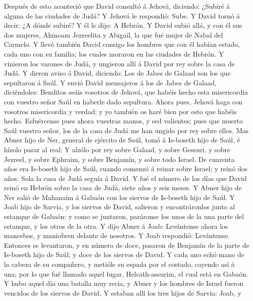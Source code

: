  Después de esto aconteció que David consultó á Jehová,
diciendo: ¿Subiré á alguna de las ciudades de Judá? Y Jehová le
respondió: Sube. Y David tornó á decir: ¿A dónde subiré? Y él le dijo: A
Hebrón.  Y David subió allá, y con él sus dos mujeres,
Ahinoam Jezreelita y Abigail, la que fué mujer de Nabal del Carmelo.
 Y llevó también David consigo los hombres que con él habían
estado, cada uno con su familia; los cuales moraron en las ciudades de
Hebrón.  Y vinieron los varones de Judá, y ungieron allí á
David por rey sobre la casa de Judá. Y dieron aviso á David, diciendo:
Los de Jabes de Galaad son los que sepultaron á Saúl.  Y
envió David mensajeros á los de Jabes de Galaad, diciéndoles: Benditos
seáis vosotros de Jehová, que habéis hecho esta misericordia con vuestro
señor Saúl en haberle dado sepultura.  Ahora pues, Jehová
haga con vosotros misericordia y verdad; y yo también os haré bien por
esto que habéis hecho.  Esfuércense pues ahora vuestras
manos, y sed valientes; pues que muerto Saúl vuestro señor, los de la
casa de Judá me han ungido por rey sobre ellos.  Mas Abner
hijo de Ner, general de ejército de Saúl, tomó á Is-boseth hijo de Saúl,
é hízolo pasar al real:  Y alzólo por rey sobre Galaad, y
sobre Gessuri, y sobre Jezreel, y sobre Ephraim, y sobre Benjamín, y
sobre todo Israel.  De cuarenta años era Is-boseth hijo de
Saúl, cuando comenzó á reinar sobre Israel; y reinó dos años. Sola la
casa de Judá seguía á David.  Y fué el número de los días
que David reinó en Hebrón sobre la casa de Judá, siete años y seis
meses.  Y Abner hijo de Ner salió de Mahanaim á Gabaón con
los siervos de Is-boseth hijo de Saúl.  Y Joab hijo de
Sarvia, y los siervos de David, salieron y encontráronlos junto al
estanque de Gabaón: y como se juntaron, paráronse los unos de la una
parte del estanque, y los otros de la otra.  Y dijo Abner á
Joab: Levántense ahora los mancebos, y maniobren delante de nosotros. Y
Joab respondió: Levántense.  Entonces se levantaron, y en
número de doce, pasaron de Benjamín de la parte de Is-boseth hijo de
Saúl; y doce de los siervos de David.  Y cada uno echó mano
de la cabeza de su compañero, y metióle su espada por el costado,
cayendo así á una; por lo que fué llamado aquel lugar, Helcath-assurim,
el cual está en Gabaón.  Y hubo aquel día una batalla muy
recia, y Abner y los hombres de Israel fueron vencidos de los siervos de
David.  Y estaban allí los tres hijos de Sarvia: Joab, y
